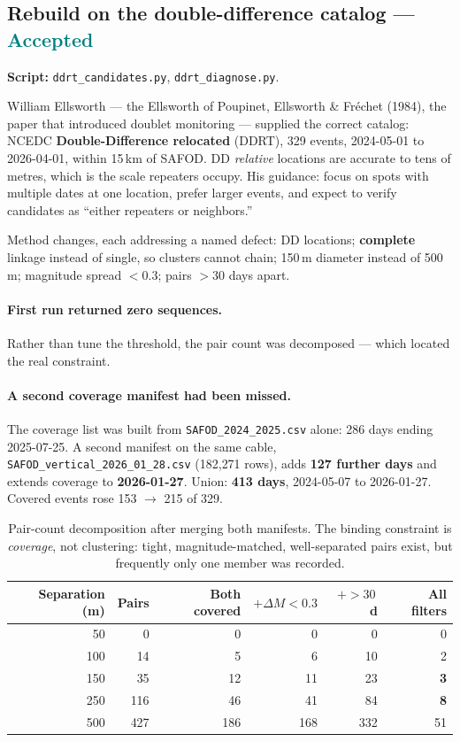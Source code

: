 \documentclass[11pt]{article}
\newcommand{\accepted}{\textcolor{teal}{\textbf{Accepted}}}
\begin{document}
\subsection{Rebuild on the double-difference catalog --- \accepted}

\textbf{Script:} \texttt{ddrt\_candidates.py}, \texttt{ddrt\_diagnose.py}.

William Ellsworth --- the Ellsworth of Poupinet, Ellsworth \& Fr\'echet (1984),
the paper that introduced doublet monitoring --- supplied the correct catalog:
NCEDC \textbf{Double-Difference relocated} (DDRT), 329 events, 2024-05-01 to
2026-04-01, within 15\,km of SAFOD. DD \emph{relative} locations are accurate to
tens of metres, which is the scale repeaters occupy. His guidance: focus on spots
with multiple dates at one location, prefer larger events, and expect to verify
candidates as ``either repeaters or neighbors.''

Method changes, each addressing a named defect: DD locations; \textbf{complete}
linkage instead of single, so clusters cannot chain; 150\,m diameter instead of
500\,m; magnitude spread $<0.3$; pairs $>30$ days apart.

\paragraph{First run returned zero sequences.} Rather than tune the threshold,
the pair count was decomposed --- which located the real constraint.

\paragraph{A second coverage manifest had been missed.} The coverage list was
built from \texttt{SAFOD\_2024\_2025.csv} alone: 286 days ending 2025-07-25. A
second manifest on the same cable,
\texttt{SAFOD\_vertical\_2026\_01\_28.csv} (182{,}271 rows), adds \textbf{127
further days} and extends coverage to \textbf{2026-01-27}. Union:
\textbf{413 days}, 2024-05-07 to 2026-01-27. Covered events rose 153 $\to$ 215
of 329.

\begin{table}[H]
\centering
\begin{tabular}{rrrrrr}
\toprule
Separation (m) & Pairs & Both covered & $+\Delta M<0.3$ & $+>30$\,d & All filters \\
\midrule
50   & 0    & 0   & 0   & 0    & 0 \\
100  & 14   & 5   & 6   & 10   & 2 \\
150  & 35   & 12  & 11  & 23   & \textbf{3} \\
250  & 116  & 46  & 41  & 84   & \textbf{8} \\
500  & 427  & 186 & 168 & 332  & 51 \\
\bottomrule
\end{tabular}
\caption{Pair-count decomposition after merging both manifests. The binding
constraint is \emph{coverage}, not clustering: tight, magnitude-matched,
well-separated pairs exist, but frequently only one member was recorded.}
\end{table}
\end{document}

